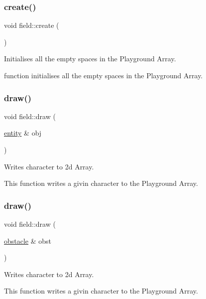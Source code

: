 \subsubsection{\texorpdfstring{create()}{create()}}
{\footnotesize\ttfamily void field\+::create (\begin{DoxyParamCaption}{ }\end{DoxyParamCaption})}



Initialises all the empty spaces in the Playground Array. 

function initialises all the empty spaces in the Playground Array. \mbox{\label{classfield_a25b067a824200a97e2795a063b440684}} 
\subsubsection{\texorpdfstring{draw()}{draw()}\hspace{0.1cm}{\footnotesize\ttfamily [1/2]}}
{\footnotesize\ttfamily void field\+::draw (\begin{DoxyParamCaption}\item[{\hyperlink{classentity}{entity} \&}]{obj }\end{DoxyParamCaption})}



Writes character to 2d Array. 

This function writes a givin character to the Playground Array. \mbox{\label{classfield_aa52bcbf98c07608197780e1e6cdfaab5}} 
\subsubsection{\texorpdfstring{draw()}{draw()}\hspace{0.1cm}{\footnotesize\ttfamily [2/2]}}
{\footnotesize\ttfamily void field\+::draw (\begin{DoxyParamCaption}\item[{\hyperlink{classobstacle}{obstacle} \&}]{obst }\end{DoxyParamCaption})}



Writes character to 2d Array. 

This function writes a givin character to the Playground Array. \mbox{\label{classfield_a272e79e7579f8485f9d082629fd23eae}} 
